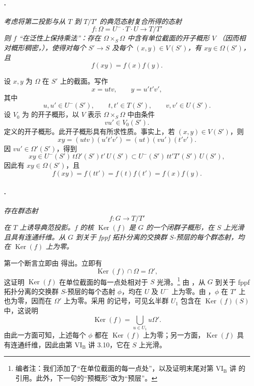 \paragraph{.}
{\itshape 考虑将第二投影与从 \(T\) 到 \(T/T'\) 的典范态射复合所得的态射
\[
  f:\Omega=U^-\cdot T\cdot U\longrightarrow T/T'
\]
则 \(f\) “在泛性上保持乘法”：存在 \(\Omega\times_S\Omega\) 中含有单位截面的开子概形 \(V\) \textup{（因而相对概形稠密，）}，使得对每个 \(S'\to S\) 及每个 \((x,y)\in V(S')\)，有 \(xy\in\Omega(S')\)，且
\[
  f(xy)=f(x)f(y).
\]}

设 \(x,y\) 为 \(\Omega\) 在 \(S'\) 上的截面。写作
\[
  x=utv,\qquad y=u't'v',
\]
其中
\[
  u,u'\in U^-(S'),\qquad t,t'\in T(S'),\qquad v,v'\in U(S').
\]
设 \(V_0\) 为  的开子概形，以 \(V\) 表示 \(\Omega\times_S\Omega\) 中由条件
\[
  vu'\in V_0(S').
\]
定义的开子概形。此开子概形具有所求性质。事实上，若 \((x,y)\in V(S')\)，则
\[
  xy=(utv)(u't'v')=(ut)(vu')(t'v').
\]
因 \(vu'\in\Omega'(S')\)，得到
\[
  xy
  \in U^-(S')\,t\Omega'(S')t'\,U(S')
  \subset U^-(S')\,tt'T'(S')\,U(S'),
\]
因此有 \(xy\in\Omega(S')\)，且
\[
  f(xy)=f(tt')=f(t)f(t')=f(x)f(y).
\]

\paragraph{.}
\textit{存在群态射}
\[
  f:G\longrightarrow T/T'
\]
\textit{在 \(T\) 上诱导典范投影。\(f\) 的核 \(\operatorname{Ker}(f)\) 是 \(G\) 的一个闭群子概形，在 \(S\) 上光滑且具有连通纤维。从 \(G\) 到关于 fppf 拓扑分离的交换群 \(S\)-预层的每个群态射，均在 \(\operatorname{Ker}(f)\) 上为零。}

第一个断言立即由  得出。立即有
\[
  \operatorname{Ker}(f)\cap\Omega=\Omega',
\]
这证明 \(\operatorname{Ker}(f)\) 在单位截面的每一点处相对于 \(S\) 光滑。\footnote{编者注：我们添加了“在单位截面的每一点处”，以及证明末尾对第 \(\mathrm{VI_B}\) 讲  的引用。此外，下一句的“预概形”改为“预层”。}
由 \textup{}，从 \(G\) 到关于 fppf 拓扑分离的交换群 \(S\)-预层的每个态射 \(\phi\)，均在 \(U\) 及 \(U^-\) 上为零。由 ，\(\phi\) 在 \(T'\) 上也为零，因而在 \(\Omega'\) 上为零。采用  的记号，可见幺半群 \(U_1\) 包含在 \(\operatorname{Ker}(f)(S)\) 中，这说明
\[
  \operatorname{Ker}(f)
  =
  \bigcup_{u\in U_1}u\Omega'.
\]
由此一方面可知，上述每个 \(\phi\) 都在 \(\operatorname{Ker}(f)\) 上为零；另一方面，\(\operatorname{Ker}(f)\) 具有连通纤维，因此由第 \(\mathrm{VI_B}\) 讲 3.10，它在 \(S\) 上光滑。

